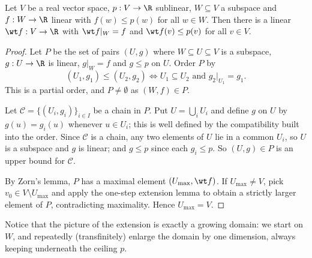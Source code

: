 \begin{theorem}
	Let $V$ be a real vector space, $p : V \to \R$ sublinear, $W \subseteq V$ a subspace and $f : W \to \R$ linear with $f(w) \leq p(w)$ for all $w \in W$. Then there is a linear $\wt f : V \to \R$ with $\wt f|_W = f$ and $\wt f(v) \leq p(v)$ for all $v \in V$.
\end{theorem}

\begin{proof}
	Let $P$ be the set of pairs $(U, g)$ where $W \subseteq U \subseteq V$ is a subspace, $g : U \to \R$ is linear, $g|_W = f$ and $g \leq p$ on $U$. Order $P$ by
	$$(U_1, g_1) \leq (U_2, g_2) \iff U_1 \subseteq U_2 \text{ and } g_2|_{U_1} = g_1.$$
	This is a partial order, and $P \neq \emptyset$ as $(W, f) \in P$.

	Let $\mathcal{C} = \{(U_i, g_i)\}_{i \in I}$ be a chain in $P$. Put $U = \bigcup_i U_i$ and define $g$ on $U$ by $g(u) = g_i(u)$ whenever $u \in U_i$; this is well defined by the compatibility built into the order. Since $\mathcal C$ is a chain, any two elements of $U$ lie in a common $U_i$, so $U$ is a subspace and $g$ is linear; and $g \leq p$ since each $g_i \leq p$. So $(U,g) \in P$ is an upper bound for $\mathcal{C}$.

	By Zorn's lemma, $P$ has a maximal element $(U_{\max}, \wt f)$. If $U_{\max} \neq V$, pick $v_0 \in V \setminus U_{\max}$ and apply the one-step extension lemma to obtain a strictly larger element of $P$, contradicting maximality. Hence $U_{\max} = V$.
\end{proof}

Notice that the picture of the extension is exactly a growing domain: we start on $W$, and repeatedly (transfinitely) enlarge the domain by one dimension, always keeping underneath the ceiling $p$.

\begin{center}
\end{center}

